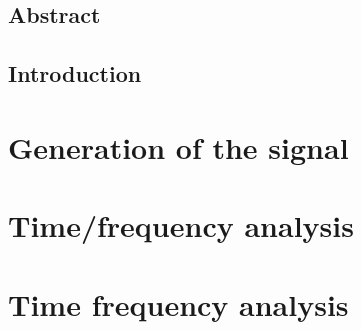 \documentclass[12pt,fleqn]{report} %
\begin{document}
\renewcommand{\contentsname}{Contents}                %
\renewcommand{\bibname}{Bibliography}  %



\tableofcontents  %
\cleardoublepage  %

\chapter*{Abstract}


\chapter*{Introduction}



\part{Generation of the signal}


\part{Time/frequency analysis}



\part{Time frequency analysis}

\end{document}
